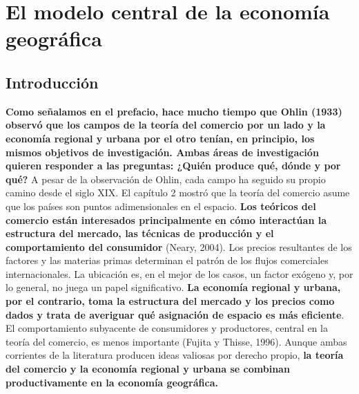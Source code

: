 \chapter{El modelo central de la economía geográfica}

\section{Introducción}
\textbf{Como señalamos en el prefacio, hace mucho tiempo que Ohlin (1933) observó que los campos de la teoría del comercio por un lado y la economía regional y urbana por el otro tenían, en principio, los mismos objetivos de investigación. Ambas áreas de investigación quieren responder a las preguntas: ¿Quién produce qué, dónde y por qué?} A pesar de la observación de Ohlin, cada campo ha seguido su propio camino desde el siglo XIX. El capítulo 2 mostró que la teoría del comercio asume que los países son puntos adimensionales en el espacio. \textbf{Los teóricos del comercio están interesados principalmente en cómo interactúan la estructura del mercado, las técnicas de producción y el comportamiento del consumidor} (Neary, 2004). Los precios resultantes de los factores y las materias primas determinan el patrón de los flujos comerciales internacionales. La ubicación es, en el mejor de los casos, un factor exógeno y, por lo general, no juega un papel significativo. \textbf{La economía regional y urbana, por el contrario, toma la estructura del mercado y los precios como dados y trata de averiguar qué asignación de espacio es más eficiente}. El comportamiento subyacente de consumidores y productores, central en la teoría del comercio, es menos importante (Fujita y Thisse, 1996). Aunque ambas corrientes de la literatura producen ideas valiosas por derecho propio, \textbf{la teoría del comercio y la economía regional y urbana se combinan productivamente en la economía geográfica.}\\

